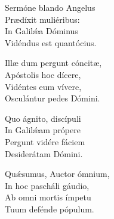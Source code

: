 Sermóne blando Angelus\\  
Prædíxit muliéribus:\\  
In Galilǽa Dóminus\\  
Vidéndus est quantócius.

Illæ dum pergunt cóncitæ,\\  
Apóstolis hoc dícere,\\  
Vidéntes eum vívere,\\  
Osculántur pedes Dómini.

Quo ágnito, discípuli\\  
In Galilǽam própere\\  
Pergunt vidére fáciem\\  
Desiderátam Dómini.

Quǽsumus, Auctor ó\-mnium,\\  
In hoc pascháli gáudio,\\  
Ab omni mortis ímpetu\\  
Tuum defénde pópulum.

